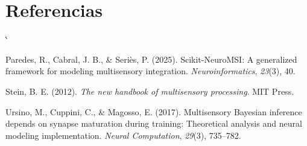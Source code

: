 \documentclass{llncs}
\makeatletter
\renewcommand{\bibsection}{\section*{Referencias}}
\renewenvironment{thebibliography}[1]{%
  \bibsection
  \list{}{%
    \setlength{\labelwidth}{0pt}%
    \setlength{\labelsep}{0pt}%
    \setlength{\leftmargin}{0pt}%
    \setlength{\itemindent}{0pt}%
    \setlength{\itemsep}{4pt plus 1pt}%
    \def\makelabel##1{}%
  }%
  \sloppy
  \sfcode`\.\@m
}{\endlist}
\makeatother
\begin{document}
\begin{thebibliography}{}
Paredes, R., Cabral, J. B., \& Seriès, P. (2025). Scikit-NeuroMSI: A
generalized framework for modeling multisensory integration.
\emph{Neuroinformatics}, \emph{23}(3), 40.

Stein, B. E. (2012). \emph{The new handbook of multisensory
processing}. MIT Press.

Ursino, M., Cuppini, C., \& Magosso, E. (2017). Multisensory Bayesian
inference depends on synapse maturation during training: Theoretical
analysis and neural modeling implementation. \emph{Neural
Computation}, \emph{29}(3), 735--782.

\end{thebibliography}
\end{document}
